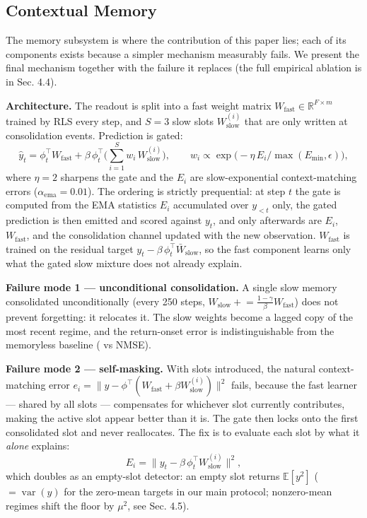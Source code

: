 \documentclass[11pt]{article}
\begin{document}
\subsection{Contextual Memory}\label{contextual-memory}

The memory subsystem is where the contribution of this paper lies; each
of its components exists because a simpler mechanism measurably fails.
We present the final mechanism together with the failure it replaces
(the full empirical ablation is in Sec. 4.4).

\textbf{Architecture.} The readout is split into a fast weight matrix
\(W_{\mathrm{fast}} \in \mathbb{R}^{F\times m}\) trained by RLS every step,
and \(S=3\) slow slots \(W_{\mathrm{slow}}^{(i)}\) that are only written at
consolidation events. Prediction is gated:
\[
\hat{y}_t = \phi_t^{\top}W_{\mathrm{fast}} + \beta\,\phi_t^{\top}\!\Big(\sum_{i=1}^{S} w_i\, W_{\mathrm{slow}}^{(i)}\Big),\qquad
w_i \propto \exp\!\big(-\eta\, E_i / \max(E_{\min},\epsilon)\big),
\]
where \(\eta=2\) sharpens the gate and the \(E_i\) are slow-exponential
context-matching errors (\(\alpha_{\mathrm{ema}}=0.01\)). The ordering is
strictly prequential: at step \(t\) the gate is computed from the EMA
statistics \(E_i\) accumulated over \(y_{<t}\) only, the gated prediction
is then emitted and scored against \(y_t\), and only afterwards are
\(E_i\), \(W_{\mathrm{fast}}\), and the consolidation channel updated with
the new observation. \(W_{\mathrm{fast}}\)
is trained on the residual target \(y_t - \beta\,\phi_t^\top
\bar{W}_{\mathrm{slow}}\), so the fast component learns only what the
gated slow mixture does not already explain.

\textbf{Failure mode 1 --- unconditional consolidation.} A single slow memory
consolidated unconditionally (every 250 steps,
\(W_{\mathrm{slow}} \mathrel{+}= \tfrac{1-\gamma}{\beta}W_{\mathrm{fast}}\))
does not prevent forgetting: it relocates it. The slow weights become a
lagged copy of the most recent regime, and the return-onset error is
indistinguishable from the memoryless baseline (\naiveOnset{} vs \blockOnset{} NMSE).

\textbf{Failure mode 2 --- self-masking.} With slots introduced, the natural
context-matching error \(e_i = \|y - \phi^\top(W_{\mathrm{fast}} +
\beta W_{\mathrm{slow}}^{(i)})\|^2\) fails, because the fast learner ---
shared by all slots --- compensates for whichever slot currently
contributes, making the active slot appear better than it is. The gate
then locks onto the first consolidated slot and never reallocates. The
fix is to evaluate each slot by what it \emph{alone} explains:
\[
E_i = \|y_t - \beta\,\phi_t^\top W_{\mathrm{slow}}^{(i)}\|^2,
\]
which doubles as an empty-slot detector: an empty slot returns
\(\mathbb{E}[y^{2}]\) (\(=\operatorname{var}(y)\) for the zero-mean targets
in our main protocol; nonzero-mean regimes shift the floor by
\(\mu^{2}\), see Sec. 4.5).
\end{document}
